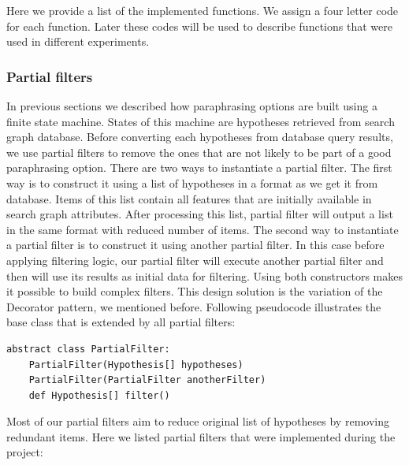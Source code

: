 Here we provide a list of the implemented functions. We assign a four letter code for each function. Later these codes will be used to describe functions that were used in different experiments.

\subsubsection{Partial filters}

In previous sections we described how paraphrasing options are built using a finite state machine. States of this machine are hypotheses retrieved from search graph database. Before converting each hypotheses from database query results, we use partial filters to remove the ones that are not likely to be part of a good paraphrasing option. There are two ways to instantiate a partial filter. The first way is to construct it using a list of hypotheses in a format as we get it from database. Items of this list contain all features that are initially available in search graph attributes. After processing this list, partial filter will output a list in the same format with reduced number of items. The second way to instantiate a partial filter is to construct it using another partial filter. In this case before applying filtering logic, our partial filter will execute another partial filter and then will use its results as initial data for filtering. Using both constructors makes it possible to build complex filters. This design solution is the variation of the Decorator pattern, we mentioned before. Following pseudocode illustrates the base class that is extended by all partial filters: 

\begin{verbatim}
abstract class PartialFilter:
    PartialFilter(Hypothesis[] hypotheses)
    PartialFilter(PartialFilter anotherFilter)
    def Hypothesis[] filter()
\end{verbatim}


Most of our partial filters aim to reduce original list of hypotheses by removing redundant items. Here we listed partial filters that were implemented during the project:

